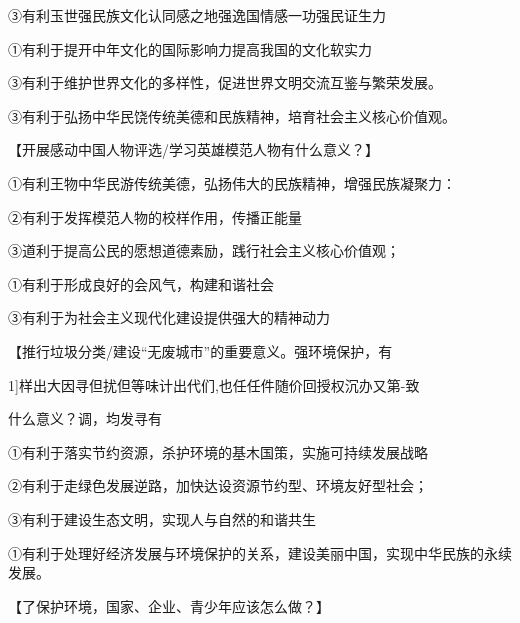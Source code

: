 \documentclass[lang=cn,11pt]{elegantbook}
\newcommand{\daofasym}[1]{{\daofasymbolfont #1}}
\newcommand{\daofasym}[1]{#1}
\begin{document}
\daofasym{③}有利玉世强民族文化认同感之地强逸国情感一功强民证生力\par

\daofasym{①}有利于提开中年文化的国际影响力提高我国的文化软实力\par

\daofasym{③}有利于维护世界文化的多样性，促进世界文明交流互鉴与繁荣发展。\par

\daofasym{③}有利于弘扬中华民饶传统美德和民族精神，培育社会主义核心价值观。\par

【开展感动中国人物评选/学习英雄模范人物有什么意义？】\par

\daofasym{①}有利王物中华民游传统美德，弘扬伟大的民族精神，增强民族凝聚力：\par

\daofasym{②}有利于发挥模范人物的校样作用，传播正能量\par

\daofasym{③}道利于提高公民的愿想道德素励，践行社会主义核心价值观；\par

\daofasym{①}有利于形成良好的会风气，构建和谐社会\par

\daofasym{③}有利于为社会主义现代化建设提供强大的精神动力\par

【推行垃圾分类/建设“无废城市”的重要意义。强环境保护，有\par

1]样出大因寻但扰但等味计出代们,也任任件随价回授权沉办又第-致\par

什么意义？调，均发寻有\par

\daofasym{①}有利于落实节约资源，杀护环境的基木国策，实施可持续发展战略\par

\daofasym{②}有利于走绿色发展逆路，加快达设资源节约型、环境友好型社会；\par

\daofasym{③}有利于建设生态文明，实现人与自然的和谐共生\par

\daofasym{①}有利于处理好经济发展与环境保护的关系，建设美丽中国，实现中华民族的永续发展。\par

【了保护环境，国家、企业、青少年应该怎么做？】\par
\end{document}
